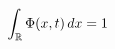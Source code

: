 \documentclass[preview]{standalone}
\begin{document}
\begin{align*}
\special{dvisvgm:raw <g id='unique000'>}\int_{\mathbb R}\Phi(x,t)\,dx=1\special{dvisvgm:raw </g>}
\end{align*}
\end{document}
